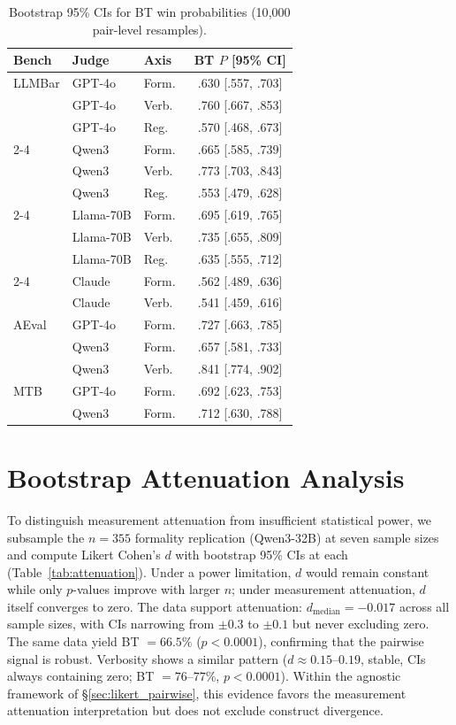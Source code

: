 \begin{table}[h]
\centering
\small
\caption{Bootstrap 95\% CIs for BT win probabilities (10{,}000 pair-level resamples).}
\label{tab:bt_ci}
\begin{tabular}{lllc}
\toprule
Bench & Judge & Axis & BT $P$ [95\% CI] \\
\midrule
LLMBar & GPT-4o & Form.\ & .630 [.557, .703] \\
 & GPT-4o & Verb.\ & .760 [.667, .853] \\
 & GPT-4o & Reg.\ & .570 [.468, .673] \\
\cmidrule{2-4}
 & Qwen3 & Form.\ & .665 [.585, .739] \\
 & Qwen3 & Verb.\ & .773 [.703, .843] \\
 & Qwen3 & Reg.\ & .553 [.479, .628] \\
\cmidrule{2-4}
 & Llama-70B & Form.\ & .695 [.619, .765] \\
 & Llama-70B & Verb.\ & .735 [.655, .809] \\
 & Llama-70B & Reg.\ & .635 [.555, .712] \\
\cmidrule{2-4}
 & Claude & Form.\ & .562 [.489, .636] \\
 & Claude & Verb.\ & .541 [.459, .616] \\
\midrule
AEval & GPT-4o & Form.\ & .727 [.663, .785] \\
 & Qwen3 & Form.\ & .657 [.581, .733] \\
 & Qwen3 & Verb.\ & .841 [.774, .902] \\
\midrule
MTB & GPT-4o & Form.\ & .692 [.623, .753] \\
 & Qwen3 & Form.\ & .712 [.630, .788] \\
\bottomrule
\end{tabular}
\end{table}

\section{Bootstrap Attenuation Analysis}
\label{app:bootstrap_attenuation}

To distinguish measurement attenuation from insufficient statistical power, we subsample the $n = 355$ formality replication (Qwen3-32B) at seven sample sizes and compute Likert Cohen's $d$ with bootstrap 95\% CIs at each (Table~\ref{tab:attenuation}).
Under a power limitation, $d$ would remain constant while only $p$-values improve with larger $n$; under measurement attenuation, $d$ itself converges to zero.
The data support attenuation: $d_{\text{median}} = {-}0.017$ across all sample sizes, with CIs narrowing from ${\pm}0.3$ to ${\pm}0.1$ but never excluding zero.
The same data yield BT $= 66.5\%$ ($p < 0.0001$), confirming that the pairwise signal is robust.
Verbosity shows a similar pattern ($d \approx 0.15$--$0.19$, stable, CIs always containing zero; BT $= 76$--$77\%$, $p < 0.0001$).
Within the agnostic framework of \S\ref{sec:likert_pairwise}, this evidence favors the measurement attenuation interpretation but does not exclude construct divergence.

